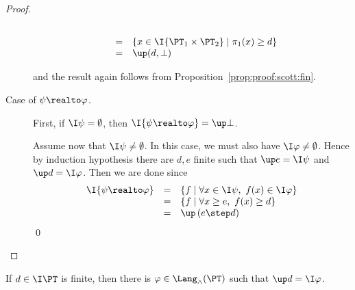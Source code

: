 \begin{proof}
\begin{description}
\[\begin{array}{l l l}
\\
& =
& \left\{
  x \in \I{\PT_1 \times \PT_2} \mid \pi_1(x) \geq d
  \right\}
\\

& =
& \up(d,\bot)
\end{array}
\]

\noindent
and the result again follows from
Proposition~\ref{prop:proof:scott:fin}.

\item[Case of $\psi \realto \varphi$.]
First, if $\I\psi = \emptyset$,
then $\I{\psi \realto \varphi} = \up \bot$.

Assume now that $\I\psi \neq \emptyset$.
In this case, we must also have $\I\varphi \neq \emptyset$.
Hence by induction hypothesis there are $d,e$ finite
such that
$\up e = \I\psi$ and $\up d = \I\varphi$.
Then we are done since
\[
\begin{array}{l l l}
  \I{\psi \realto \varphi}
& =
& \left\{ f \mid \forall x \in \I\psi,~ f(x) \in \I\varphi\right\}
\\

& =
& \left\{ f \mid \forall x \geq e,~ f(x) \geq d\right\}
\\

& =
& \up \left(e \step d \right)
\end{array}
\]
\qed
\end{description}
\end{proof}

\begin{lemma}
\label{lem:proof:top:compact-open:fin}
If $d \in \I\PT$ is finite,
then there is
$\varphi \in \Lang_\land(\PT)$
such that $\up d = \I\varphi$.
\end{lemma}

